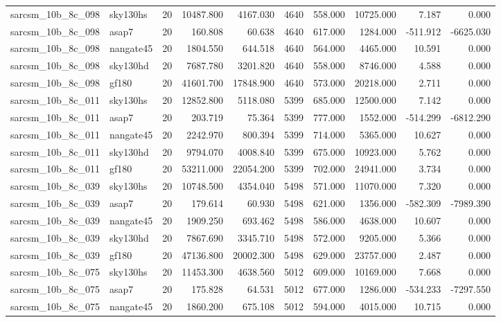 \begin{tabular}{llrrrrrrrr}
sarcsm\_10b\_8c\_098 & sky130hs & 20 & 10487.800 & 4167.030 & 4640 & 558.000 & 10725.000 & 7.187 & 0.000 \\
sarcsm\_10b\_8c\_098 & asap7 & 20 & 160.808 & 60.638 & 4640 & 617.000 & 1284.000 & -511.912 & -6625.030 \\
sarcsm\_10b\_8c\_098 & nangate45 & 20 & 1804.550 & 644.518 & 4640 & 564.000 & 4465.000 & 10.591 & 0.000 \\
sarcsm\_10b\_8c\_098 & sky130hd & 20 & 7687.780 & 3201.820 & 4640 & 558.000 & 8746.000 & 4.588 & 0.000 \\
sarcsm\_10b\_8c\_098 & gf180 & 20 & 41601.700 & 17848.900 & 4640 & 573.000 & 20218.000 & 2.711 & 0.000 \\
sarcsm\_10b\_8c\_011 & sky130hs & 20 & 12852.800 & 5118.080 & 5399 & 685.000 & 12500.000 & 7.142 & 0.000 \\
sarcsm\_10b\_8c\_011 & asap7 & 20 & 203.719 & 75.364 & 5399 & 777.000 & 1552.000 & -514.299 & -6812.290 \\
sarcsm\_10b\_8c\_011 & nangate45 & 20 & 2242.970 & 800.394 & 5399 & 714.000 & 5365.000 & 10.627 & 0.000 \\
sarcsm\_10b\_8c\_011 & sky130hd & 20 & 9794.070 & 4008.840 & 5399 & 675.000 & 10923.000 & 5.762 & 0.000 \\
sarcsm\_10b\_8c\_011 & gf180 & 20 & 53211.000 & 22054.200 & 5399 & 702.000 & 24941.000 & 3.734 & 0.000 \\
sarcsm\_10b\_8c\_039 & sky130hs & 20 & 10748.500 & 4354.040 & 5498 & 571.000 & 11070.000 & 7.320 & 0.000 \\
sarcsm\_10b\_8c\_039 & asap7 & 20 & 179.614 & 60.930 & 5498 & 621.000 & 1356.000 & -582.309 & -7989.390 \\
sarcsm\_10b\_8c\_039 & nangate45 & 20 & 1909.250 & 693.462 & 5498 & 586.000 & 4638.000 & 10.607 & 0.000 \\
sarcsm\_10b\_8c\_039 & sky130hd & 20 & 7867.690 & 3345.710 & 5498 & 572.000 & 9205.000 & 5.366 & 0.000 \\
sarcsm\_10b\_8c\_039 & gf180 & 20 & 47136.800 & 20002.300 & 5498 & 629.000 & 23757.000 & 2.487 & 0.000 \\
sarcsm\_10b\_8c\_075 & sky130hs & 20 & 11453.300 & 4638.560 & 5012 & 609.000 & 10169.000 & 7.668 & 0.000 \\
sarcsm\_10b\_8c\_075 & asap7 & 20 & 175.828 & 64.531 & 5012 & 677.000 & 1286.000 & -534.233 & -7297.550 \\
sarcsm\_10b\_8c\_075 & nangate45 & 20 & 1860.200 & 675.108 & 5012 & 594.000 & 4015.000 & 10.715 & 0.000 \\

\end{tabular}
